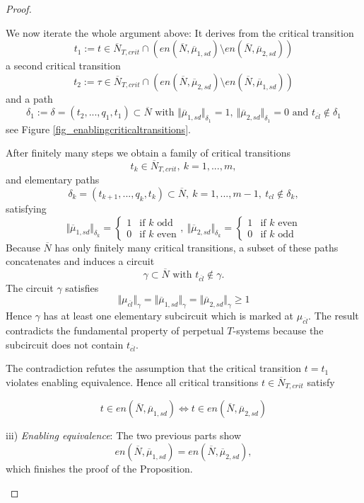 \documentclass{fundam}
\newcommand{\qed}{}
\begin{document}
\begin{proof}
\begin{enumerate}
\noindent We now iterate the whole argument above: It derives from the critical transition
$$t_1:=t \in \overline{N}_{T,crit} \cap \left(en(\overline{N},\overline{\mu}_{1,sd}) \setminus en(\overline{N},\overline{\mu}_{2,sd})\right)$$
a second critical transition
$$t_2:=\tau \in \overline{N}_{T,crit} \cap \left(en(\overline{N},\overline{\mu}_{2,sd}) \setminus en(\overline{N},\overline{\mu}_{1,sd})\right)$$
and a path
$$\delta_1:=\delta=(t_2,...,q_1,t_1) \subset \overline{N} \text{ with } \Vert \overline{\mu}_{1,sd} \Vert_{\delta_1}=1,\ \Vert \overline{\mu}_{2,sd} \Vert_{\delta_1}=0
\text{ and } t_{\overline{cl}} \notin \delta_1$$
see Figure \ref{fig_enablingcriticaltransitions}.

\medskip After finitely many steps we obtain a family of critical transitions
$$t_k \in \overline{N}_{T,crit}, \ k=1,...,m,$$
and elementary paths $$\delta_k=(t_{k+1},...,q_k,t_k) \subset \overline{N},\ k=1,...,m-1,\ t_{cl} \notin \delta_k,$$
satisfying
$$\Vert \overline{\mu}_{1,sd} \Vert_{\delta_k}=\begin{cases}
1 & \text{if } k \text{ odd} \\
0 & \text{if } k \text{ even} \end{cases},\ \Vert \overline{\mu}_{2,sd} \Vert_{\delta_k}=\begin{cases}
1 & \text{if } k \text{ even} \\
0 & \text{if } k \text{ odd} \end{cases}$$
Because $\overline{N}$ has only finitely many critical transitions, a subset of these paths concatenates and induces a circuit
$$\gamma \subset \overline{N} \text{ with } t_{\overline{cl}} \notin \gamma.$$
The circuit $\gamma$ satisfies
$$\Vert \mu_{\overline{cl}} \Vert_\gamma= \Vert \overline{\mu}_{1,sd} \Vert_\gamma= \Vert \overline{\mu}_{2,sd} \Vert_\gamma \geq 1$$
Hence $\gamma$ has at least one elementary subcircuit which is marked at $\mu_{\overline{cl}}$. The result contradicts the fundamental property of perpetual $T$-systems because the subcircuit does not contain $t_{\overline{cl}}$.

\begin{flushleft}
The contradiction refutes the assumption that the critical transition $t=t_1$ violates enabling equivalence. Hence all critical transitions $t \in \overline{N}_{T,crit}$ satisfy
\end{flushleft}
$$t \in en(\overline{N},\overline{\mu}_{1,sd}) \iff t \in en(\overline{N},\overline{\mu}_{2,sd})$$

\noindent iii) \emph{Enabling equivalence}: The two previous parts show
$$en(\overline{N},\overline{\mu}_{1,sd}) = en(\overline{N},\overline{\mu}_{2,sd}),$$
which finishes the proof of the Proposition.\qed
\end{enumerate}

\vspace*{-7mm}
\end{proof}
\end{document}
